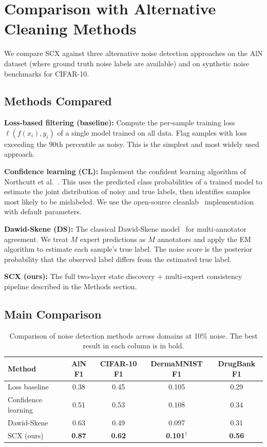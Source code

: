 \documentclass[11pt,a4paper]{article}
\begin{document}
\section{Comparison with Alternative Cleaning Methods}
\label{sec:S3}

We compare SCX against three alternative noise detection approaches on the AlN dataset (where ground truth noise labels are available) and on synthetic noise benchmarks for CIFAR-10.

\subsection{Methods Compared}

\textbf{Loss-based filtering (baseline):} Compute the per-sample training loss $\ell(f(x_i), y_i)$ of a single model trained on all data. Flag samples with loss exceeding the 90th percentile as noisy. This is the simplest and most widely used approach.

\textbf{Confidence learning (CL):} Implement the confident learning algorithm of Northcutt et al.~\cite{northcutt2021confident}. This uses the predicted class probabilities of a trained model to estimate the joint distribution of noisy and true labels, then identifies samples most likely to be mislabeled. We use the open-source cleanlab~\cite{cleanlab} implementation with default parameters.

\textbf{Dawid-Skene (DS):} The classical Dawid-Skene model~\cite{dawid1979maximum} for multi-annotator agreement. We treat $M$ expert predictions as $M$ annotators and apply the EM algorithm to estimate each sample's true label. The noise score is the posterior probability that the observed label differs from the estimated true label.

\textbf{SCX (ours):} The full two-layer state discovery + multi-expert consistency pipeline described in the Methods section.

\subsection{Main Comparison}

\begin{table}[H]
\centering
\caption{Comparison of noise detection methods across domains at 10\% noise. The best result in each column is in bold.}
\label{tab:S3_comparison}
\begin{tabular}{lcccc}
\toprule
Method & AlN F1 & CIFAR-10 F1 & DermaMNIST F1 & DrugBank F1 \\
\midrule
Loss baseline & 0.38 & 0.45 & 0.105 & 0.29 \\
Confidence learning & 0.51 & 0.53 & 0.108 & 0.34 \\
Dawid-Skene & 0.63 & 0.49 & 0.097 & 0.31 \\
SCX (ours) & \textbf{0.87} & \textbf{0.62} & \textbf{0.101}$^\dagger$ & \textbf{0.56} \\
\bottomrule
\end{tabular}

\end{table}
\end{document}
